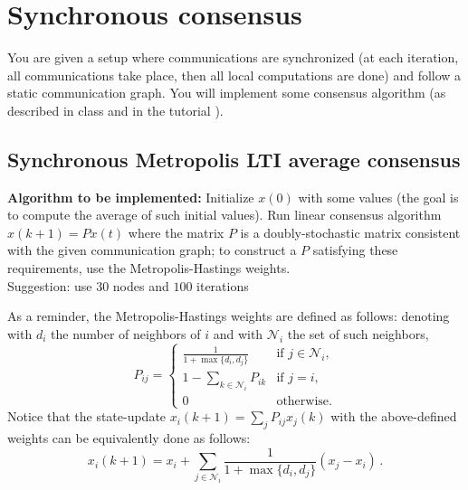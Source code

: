 \documentclass{article}
\newcommand{\mc}{\mathcal}
\begin{document}
\section{Synchronous consensus}
You are given a setup where communications are synchronized (at each iteration,
all communications take place, then all local computations are done) and follow a static communication graph.
You will implement some consensus algorithm (as described in class and in the tutorial \cite{consensus-tutorial}).


\subsection{Synchronous Metropolis LTI average consensus}
\textbf{Algorithm to be implemented:}
Initialize $x(0)$ with some values (the goal is to compute the average of such initial values). Run linear consensus algorithm $x(k+1) = P x(t)$ where the matrix $P$ is a doubly-stochastic matrix consistent with the given communication graph; to construct a $P$ satisfying these requirements, use the Metropolis-Hastings weights. \\
Suggestion: use $30$ nodes and $100$ iterations

As a reminder, the Metropolis-Hastings weights are defined as follows:
denoting with $d_i$ the number of neighbors of $i$ and with $\mc N_i$ the set of such neighbors,
\[ P_{ij} =
\begin{cases}
\frac{1}{1+\max\{d_i, d_j \}} & \text{if $j \in \mc N_i$,}\\
1-\sum_{k \in \mc N_i} P_{ik} & \text{if $j = i$,}\\
0							  & \text{otherwise}.
\end{cases}
\]
Notice that the state-update $x_i(k+1) = \sum_j P_{ij} x_j(k)$ with the above-defined weights can be equivalently done as follows:
\[ x_i(k+1) = x_i + \sum_{j \in \mc N_i} \frac{1}{1+\max\{d_i, d_j \}} (x_j - x_i) \,.\]
\end{document}
